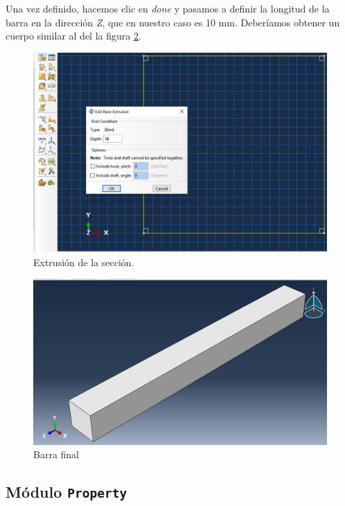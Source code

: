 \documentclass[spanish,a4paper,12pt]{article}
\begin{document}
Una vez definido, hacemos clic en \emph{done} y pasamos a definir la longitud de la barra en la dirección \emph{Z}, que en nuestro caso es 10 mm. Deberíamos obtener un cuerpo similar al del la figura \ref{fig:bar2b}.

\begin{figure}[h!tp]
\centering
\includegraphics[scale=0.4]{capturas/sec1.png}
\caption{Extrusión de la sección.}
\label{fig:bar2a}
\end{figure}
\begin{figure}[h!tp]
\centering
\includegraphics[scale=0.30]{capturas/sec2.png}
\caption{Barra final}
\label{fig:bar2b}
\end{figure}


\subsection{Módulo \texttt{Property}}
\end{document}
